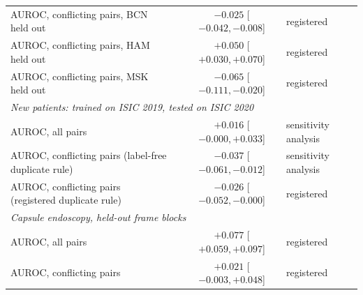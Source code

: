 \begin{table}[!tbp]
{\begin{tabular}{lccl}
AUROC, conflicting pairs, BCN held out &  & $-0.025$ [$-0.042, -0.008$] & registered \\
AUROC, conflicting pairs, HAM held out &  & $+0.050$ [$+0.030, +0.070$] & registered \\
AUROC, conflicting pairs, MSK held out &  & $-0.065$ [$-0.111, -0.020$] & registered \\
\multicolumn{4}{l}{\emph{New patients: trained on ISIC 2019, tested on ISIC 2020}} \\
AUROC, all pairs &  & $+0.016$ [$-0.000, +0.033$] & sensitivity analysis \\
AUROC, conflicting pairs (label-free duplicate rule) &  & $-0.037$ [$-0.061, -0.012$] & sensitivity analysis \\
AUROC, conflicting pairs (registered duplicate rule) &  & $-0.026$ [$-0.052, -0.000$] & registered \\
\multicolumn{4}{l}{\emph{Capsule endoscopy, held-out frame blocks}} \\
AUROC, all pairs &  & $+0.077$ [$+0.059, +0.097$] & registered \\
AUROC, conflicting pairs &  & $+0.021$ [$-0.003, +0.048$] & registered \\
\bottomrule\end{tabular}}
\end{table}
